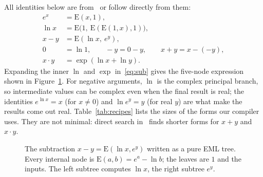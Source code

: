 \documentclass[11pt]{article}
\newcommand{\E}{\mathrm{E}}
\begin{document}
All identities below are from~\cite{odrzywolek2026} or follow directly from
them:
\begin{align}
  e^{x} &= \E(x,1), \\
  \ln x &= \E\bigl(1,\ \E(\E(1,x),1)\bigr), \\
  x - y &= \E(\ln x,\ e^{y}), \label{eq:sub}\\
  0 &= \ln 1, \qquad -y = 0 - y, \qquad x + y = x - (-y), \\
  x \cdot y &= \exp(\ln x + \ln y).
\end{align}
Expanding the inner $\ln$ and $\exp$ in~\eqref{eq:sub} gives the five-node
expression shown in Figure~\ref{fig:recipes}. For negative arguments, $\ln$
is the complex principal branch, so intermediate values can be complex even
when the final result is real; the identities $e^{\ln x}=x$ (for $x\ne0$) and
$\ln e^{y}=y$ (for real $y$) are what make the results come out real.
Table~\ref{tab:recipes} lists the sizes of the forms our compiler uses. They
are not minimal: direct search in~\cite{odrzywolek2026} finds shorter forms
for $x+y$ and $x\cdot y$.

\begin{figure}[htbp]
\centering
{}
\caption{The subtraction $x-y=\E(\ln x,e^{y})$ written as a pure EML tree.
Every internal node is $\E(a,b)=e^{a}-\ln b$; the leaves are $1$ and the
inputs. The left subtree computes $\ln x$, the right subtree $e^{y}$.}
\label{fig:recipes}
\end{figure}
\end{document}
